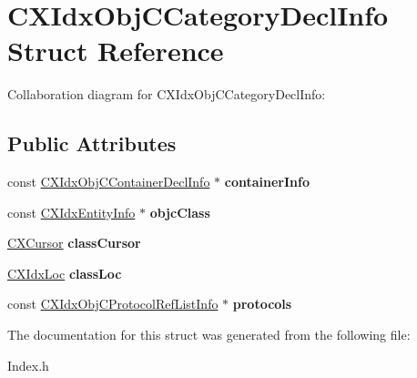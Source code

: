 \hypertarget{structCXIdxObjCCategoryDeclInfo}{}\section{C\+X\+Idx\+Obj\+C\+Category\+Decl\+Info Struct Reference}
\label{structCXIdxObjCCategoryDeclInfo}


Collaboration diagram for C\+X\+Idx\+Obj\+C\+Category\+Decl\+Info\+:
\subsection*{Public Attributes}
\begin{DoxyCompactItemize}
\item 
\mbox{\label{structCXIdxObjCCategoryDeclInfo_ada62478182e0d4c1d6532acc30626441}} 
const \hyperlink{structCXIdxObjCContainerDeclInfo}{C\+X\+Idx\+Obj\+C\+Container\+Decl\+Info} $\ast$ {\bfseries container\+Info}
\item 
\mbox{\label{structCXIdxObjCCategoryDeclInfo_a4a005c49962d2d79f43948a3c99574cb}} 
const \hyperlink{structCXIdxEntityInfo}{C\+X\+Idx\+Entity\+Info} $\ast$ {\bfseries objc\+Class}
\item 
\mbox{\label{structCXIdxObjCCategoryDeclInfo_a33abfefb90d13fe4db7f65493139d56c}} 
\hyperlink{structCXCursor}{C\+X\+Cursor} {\bfseries class\+Cursor}
\item 
\mbox{\label{structCXIdxObjCCategoryDeclInfo_a15f100b066927d642068d564adbf9c45}} 
\hyperlink{structCXIdxLoc}{C\+X\+Idx\+Loc} {\bfseries class\+Loc}
\item 
\mbox{\label{structCXIdxObjCCategoryDeclInfo_a756b51f99ced89cf5f3c4b7bf6196b2d}} 
const \hyperlink{structCXIdxObjCProtocolRefListInfo}{C\+X\+Idx\+Obj\+C\+Protocol\+Ref\+List\+Info} $\ast$ {\bfseries protocols}
\end{DoxyCompactItemize}


The documentation for this struct was generated from the following file\+:\begin{DoxyCompactItemize}
\item 
Index.\+h\end{DoxyCompactItemize}
